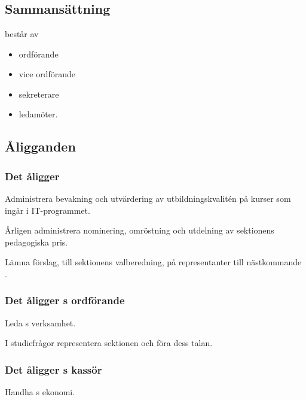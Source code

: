 \section{\SNITFULL}


\subsection{Sammansättning}
\SNIT{} består av
\begin{itemize}
    \item ordförande
    \item vice ordförande
    \item sekreterare
    \item ledamöter.
\end{itemize}

\subsection{Åligganden}

\subsubsection{Det åligger \SNIT}

\begin{att}
	\item Administrera bevakning och utvärdering av utbildningskvalitén på kurser som ingår i IT-programmet.
	\item Årligen administrera nominering, omröstning och utdelning av sektionens pedagogiska pris.
	\item Lämna förslag, till sektionens valberedning, på representanter till nästkommande \SNIT.
\end{att}

\subsubsection{Det åligger \SNIT{}s ordförande}
\begin{att}
	\item Leda \SNIT{}s verksamhet.
	\item I studiefrågor representera sektionen och föra dess talan.
\end{att}

\subsubsection{Det åligger \SNIT{}s kassör}
\begin{att}
	\item Handha \SNIT{}s ekonomi.
\end{att}

